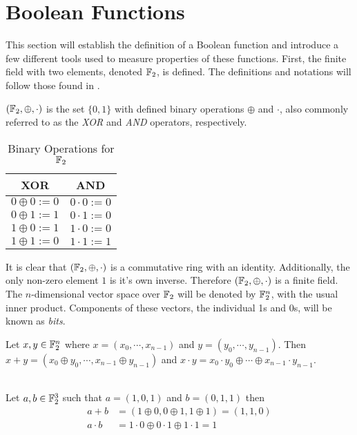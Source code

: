 \section{Boolean Functions}
\par This section will establish the definition of a Boolean function and introduce
a few different tools used to measure properties of these functions. First, the
finite field with two elements, denoted $\mathbb{F}_2$, is defined. The definitions and
notations will follow those found in \cite{bk:cs09}.

\begin{definition}
\label{def:GF(2)}
	$(\mathbb{F}_2,\oplus,\cdot)$ is the set $\{0,1\}$ with defined binary operations $\oplus$ and $\cdot$, also
	commonly referred to as the {\em XOR} and {\em AND} operators, respectively.
	\begin{table}[h!]\label{table:GF(2)}
		\centering
		\begin{tabular}{|c|c|}
			\hline
			XOR&AND\\
			\hline
			$0\oplus0:=0$&$0\cdot0:=0$\\
			$0\oplus1:=1$&$0\cdot1:=0$\\
			$1\oplus0:=1$&$1\cdot0:=0$\\
			$1\oplus1:=0$&$1\cdot1:=1$\\
			\hline
		\end{tabular}
		\caption{Binary Operations for $\mathbb{F}_2$}
	\end{table}
\end{definition}

\par It is clear that $(\mathbb{F}_2,\oplus,\cdot)$ is a commutative ring with an identity.
Additionally, the only non-zero element $1$ is it's own inverse. Therefore $(\mathbb{F}_2,\oplus,\cdot)$
is a finite field. The $n$-dimensional vector space over $\mathbb{F}_2$ will be denoted by $\mathbb{F}_2^n$,
with the usual inner product. Components of these vectors, the individual 1s and 0s, will
be known as {\em bits}.

\begin{remark}
	Let $x,y\in\mathbb{F}_2^n$ where $x=(x_0,\cdots,x_{n-1})$ and $y=(y_0,\cdots,y_{n-1})$.
	Then $x+y=(x_0\oplus y_0,\cdots,x_{n-1}\oplus y_{n-1})$ and 
	$x\cdot y=x_0\cdot y_0 \oplus \cdots \oplus x_{n-1}\cdot y_{n-1}$. \\ \\
\end{remark}

\begin{example}
	Let $a,b\in\mathbb{F}_2^3$ such that $a=(1,0,1)$ and $b=(0,1,1)$ then
	\begin{align*}
		a+b      &=(1\oplus0,0\oplus1,1\oplus1)=(1,1,0) \\
		a\cdot b &=1\cdot0\oplus0\cdot1\oplus1\cdot1=1
	\end{align*}
\end{example}

